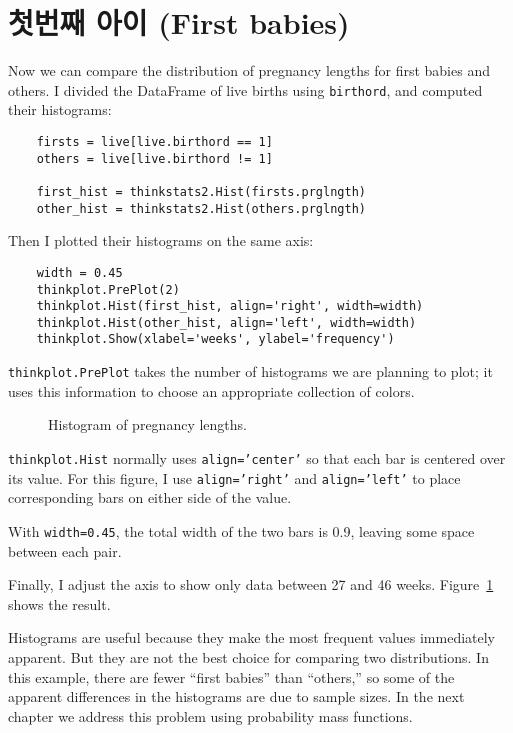 \section{첫번째 아이 (First babies)}



Now we can compare the distribution of pregnancy lengths for first
babies and others.  I divided the DataFrame of live births using
{\tt birthord}, and computed their histograms:

\begin{verbatim}
    firsts = live[live.birthord == 1]
    others = live[live.birthord != 1]

    first_hist = thinkstats2.Hist(firsts.prglngth)
    other_hist = thinkstats2.Hist(others.prglngth)
\end{verbatim}

Then I plotted their histograms on the same axis:

\begin{verbatim}
    width = 0.45
    thinkplot.PrePlot(2)
    thinkplot.Hist(first_hist, align='right', width=width)
    thinkplot.Hist(other_hist, align='left', width=width)
    thinkplot.Show(xlabel='weeks', ylabel='frequency')
\end{verbatim}

{\tt thinkplot.PrePlot} takes the number of histograms
we are planning to plot; it uses this information to choose
an appropriate collection of colors.

\begin{figure}
\caption{Histogram of pregnancy lengths.}
\label{first_nsfg_hist}
\end{figure}

{\tt thinkplot.Hist} normally uses {\tt align='center'} so that
each bar is centered over its value.  For this figure, I use
{\tt align='right'} and {\tt align='left'} to place
corresponding bars on either side of the value.

With {\tt width=0.45}, the total width of the two bars is 0.9,
leaving some space between each pair.

Finally, I adjust the axis to show only data between 27 and 46 weeks.
Figure~\ref{first_nsfg_hist} shows the result.

Histograms are useful because they make the most frequent values
immediately apparent.  But they are not the best choice for comparing
two distributions.  In this example, there are fewer ``first babies''
than ``others,'' so some of the apparent differences in the histograms
are due to sample sizes.  In the next chapter we address this problem
using probability mass functions.


